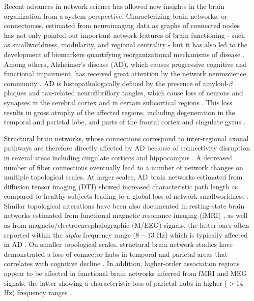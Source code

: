 
Recent advances in network science has allowed new insights in the brain organization from a system perspective.
Characterizing brain networks, or connectomes, estimated from neuroimaging data as graphs of connected nodes has not only pointed out important network features of brain functioning - such as smallworldness, modularity, and regional centrality - but it has also led to the development of biomarkers quantifying reorganizational mechanisms of disease \citep{stam_modern_2014}.
Among others, Alzheimer's disease (AD), which causes progressive cognitive and functional impairment, has received great attention by the network neuroscience community \citep{stam_modern_2014,tijms_alzheimers_2013,stam_use_2010}.
AD is histopathologically defined by the presence of amyloid-$\beta$ plaques and tau-related neurofibrillary tangles, which cause loss of neurons and synapses in the cerebral cortex and in certain subcortical regions \citep{tijms_alzheimers_2013}. This loss results in gross atrophy of the affected regions, including degeneration in the temporal and parietal lobe, and parts of the frontal cortex and cingulate gyrus \citep{wenk_neuropathologic_2003}.

Structural brain networks, whose connections correspond to inter-regional axonal pathways are therefore directly affected by AD because of connectivity disruption in several areas including cingulate cortices and hippocampus \citep{rose_loss_2000,zhou_abnormal_2008}.
A decreased number of fiber connections eventually lead to a number of network changes on multiple topological scales.
At larger scales, AD brain networks estimated from diffusion tensor imaging (DTI) showed increased characteristic path length as compared to healthy subjects leading to a global loss of network smallworldness \citep{lo_diffusion_2010,tijms_alzheimers_2013}.
Similar topological alterations have been also documented in resting-state brain networks estimated from functional magnetic resonance imaging (fMRI) \citep{sanz-arigita_loss_2010-1}, as well as from magneto/electroencephalographic (M/EEG) signals, the latter ones often reported within the \textit{alpha} frequency range ($8-13$ Hz) which is typically affected in AD \citep{stam_graph_2009,de_haan_functional_2009,miraglia_searching_2017}.
On smaller topological scales, structural brain network studies have demonstrated a loss of connector hubs in temporal and parietal areas that correlates with cognitive decline \citep{bassett_dynamic_2011,tijms_alzheimers_2013,crossley_hubs_2014}.
In addition, higher-order association regions appear to be affected in functional brain networks inferred from fMRI \citep{buckner_cortical_2009,tijms_alzheimers_2013} and MEG signals, the latter showing a characteristic loss of parietal hubs in higher ($>14$ Hz) frequency ranges \citep{de_haan_disrupted_2012,engels_declining_2015}.

